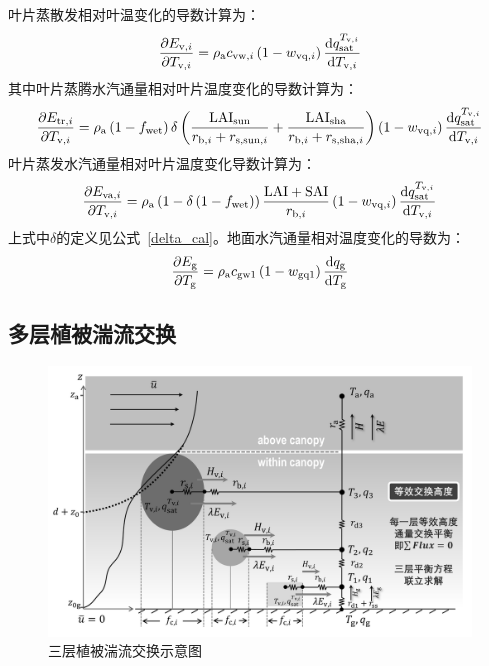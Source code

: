 %
叶片蒸散发相对叶温变化的导数计算为：
\begin{equation}
  \frac{\partial E_{\mathrm{v},i}}{\partial T_{\mathrm{v},i}} = \rho_{\mathrm{a}}c_{\mathrm{vw},i}\left( 1 - w_{\mathrm{vq},i} \right)\frac{{\rm d}q_{\mathrm{sat}}^{T_{\mathrm{v},i}}}{{\rm d}T_{\mathrm{v},i}}
\end{equation}
%
其中叶片蒸腾水汽通量相对叶片温度变化的导数计算为：
\begin{equation}
  \frac{\partial E_{\mathrm{tr},i}}{\partial T_{\mathrm{v},i}} = \rho_{\mathrm{a}}\left( 1 - f_{\mathrm{wet}} \right)\delta\left( \frac{\text{LAI}_{\mathrm{sun}}}{r_{\mathrm{b},i} + r_{\mathrm{s},\mathrm{sun},i}} + \frac{\text{LAI}_{\mathrm{sha}}}{r_{\mathrm{b},i} + r_{\mathrm{s,sha},i}} \right)\left( 1 - w_{\mathrm{vq},i} \right)\frac{{\rm d}q_{\mathrm{sat}}^{T_{\mathrm{v},i}}}{{\rm d}T_{\mathrm{v},i}}
\end{equation}
%
叶片蒸发水汽通量相对叶片温度变化导数计算为：
\begin{equation}
  \frac{\partial E_{\mathrm{va},i}}{\partial T_{\mathrm{v},i}} = \rho_{\mathrm{a}}\left( 1 - \delta\left( 1 - f_{\mathrm{wet}} \right) \right)\frac{\text{LAI} + \text{SAI}}{r_{\mathrm{b},i}}\left( 1 - w_{\mathrm{vq},i} \right)\frac{{\rm d}q_{\mathrm{sat}}^{T_{\mathrm{v},i}}}{{\rm d}T_{\mathrm{v},i}}
\end{equation}
%
上式中$\delta$的定义见公式~\eqref{delta_cal}。地面水汽通量相对温度变化的导数为：
\begin{equation}
  \frac{\partial E_{\mathrm{g}}}{\partial T_{\mathrm{g}}} = \rho_{\mathrm{a}}c_{\mathrm{gw1}}\left( 1 - w_{\mathrm{gq1}} \right)\frac{{\rm d}q_{\mathrm{g}}}{{\rm d}T_{\mathrm{g}}}
\end{equation}


\subsection{多层植被湍流交换}\label{多层植被湍流交换}
{
  \begin{figure}[htbp]
    \centering
    \includegraphics[width=1\linewidth]{Figures/地表湍流交换过程/三层植被湍流交换示意图_v4.jpg}
    \caption{三层植被湍流交换示意图}
    \label{fig:三层植被湍流交换示意图}
  \end{figure}
}

